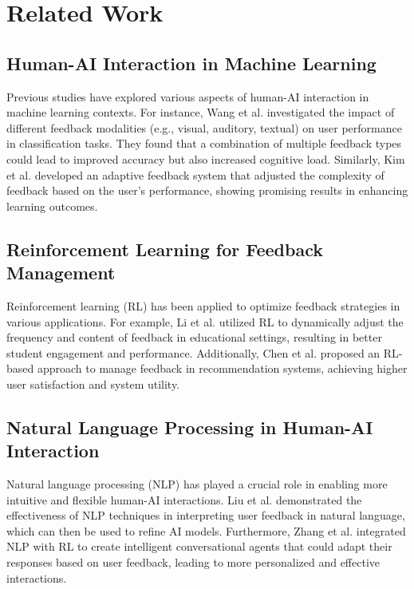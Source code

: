 \documentclass{article}
\begin{document}
\section{Related Work}
\subsection{Human-AI Interaction in Machine Learning}
Previous studies have explored various aspects of human-AI interaction in machine learning contexts. For instance, Wang et al. \cite{wang2019impact} investigated the impact of different feedback modalities (e.g., visual, auditory, textual) on user performance in classification tasks. They found that a combination of multiple feedback types could lead to improved accuracy but also increased cognitive load. Similarly, Kim et al. \cite{kim2020adaptive} developed an adaptive feedback system that adjusted the complexity of feedback based on the user's performance, showing promising results in enhancing learning outcomes.

\subsection{Reinforcement Learning for Feedback Management}
Reinforcement learning (RL) has been applied to optimize feedback strategies in various applications. For example, Li et al. \cite{li2018dynamic} utilized RL to dynamically adjust the frequency and content of feedback in educational settings, resulting in better student engagement and performance. Additionally, Chen et al. \cite{chen2020optimizing} proposed an RL-based approach to manage feedback in recommendation systems, achieving higher user satisfaction and system utility.

\subsection{Natural Language Processing in Human-AI Interaction}
Natural language processing (NLP) has played a crucial role in enabling more intuitive and flexible human-AI interactions. Liu et al. \cite{liu2019interpreting} demonstrated the effectiveness of NLP techniques in interpreting user feedback in natural language, which can then be used to refine AI models. Furthermore, Zhang et al. \cite{zhang2021intelligent} integrated NLP with RL to create intelligent conversational agents that could adapt their responses based on user feedback, leading to more personalized and effective interactions.
\end{document}
